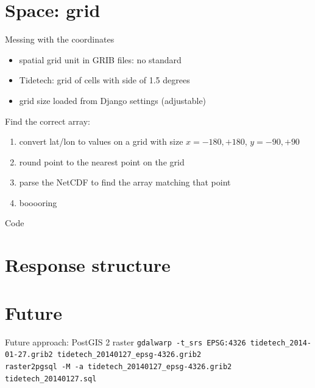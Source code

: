 \documentclass[xcolor=svgnames]{beamer}
\begin{document}
\section{Space: grid}

    \begin{frame}{Messing with the coordinates}
        \begin{itemize}
            \item spatial grid unit in GRIB files: no standard
            \item Tidetech: grid of cells with side of 1.5 degrees
            \item grid size loaded from Django settings (adjustable)
        \end{itemize}
        Find the correct array:
        \begin{enumerate}
            \item convert lat/lon to values on a grid with size $x={-180,+180}$, $y={-90,+90}$
            \pause
            \item round point to the nearest point on the grid
            \pause
            \item parse the NetCDF to find the array matching that point
            \pause
            \item booooring
        \end{enumerate}
    \end{frame}

    \begin{frame}{Code}
        \note{\scriptsize{}}
        \note{\scriptsize{}}
    \end{frame}

\section{Response structure}

    \begin{frame}
    \end{frame}

\section{Future}

    \begin{frame}{Future approach: PostGIS 2 raster}
        \tiny{
            \texttt{gdalwarp -t\_srs EPSG:4326 tidetech\_2014-01-27.grib2 tidetech\_20140127\_epsg-4326.grib2}\\
            \texttt{raster2pgsql -M -a tidetech\_20140127\_epsg-4326.grib2 tidetech\_20140127.sql}
    }
    \end{frame}
\end{document}
